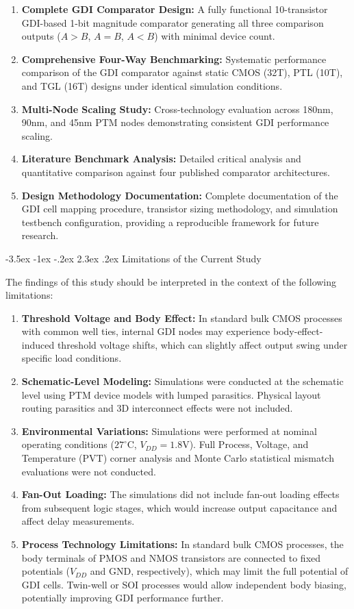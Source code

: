 \documentclass[12pt,a4paper,oneside]{report}
\makeatletter
\renewcommand\section{\@startsection {section}{1}{\z@}%
                                   {-3.5ex \@plus -1ex \@minus -.2ex}%
                                   {2.3ex \@plus.2ex}%
                                   {\normalfont\normalsize\bfseries}}
\makeatother
\begin{document}
\begin{enumerate}
\item \textbf{Complete GDI Comparator Design:} A fully functional 10-transistor GDI-based 1-bit magnitude comparator generating all three comparison outputs ($A>B$, $A=B$, $A<B$) with minimal device count.
\item \textbf{Comprehensive Four-Way Benchmarking:} Systematic performance comparison of the GDI comparator against static CMOS (32T), PTL (10T), and TGL (16T) designs under identical simulation conditions.
\item \textbf{Multi-Node Scaling Study:} Cross-technology evaluation across 180nm, 90nm, and 45nm PTM nodes demonstrating consistent GDI performance scaling.
\item \textbf{Literature Benchmark Analysis:} Detailed critical analysis and quantitative comparison against four published comparator architectures.
\item \textbf{Design Methodology Documentation:} Complete documentation of the GDI cell mapping procedure, transistor sizing methodology, and simulation testbench configuration, providing a reproducible framework for future research.
\end{enumerate}

\section{Limitations of the Current Study}

The findings of this study should be interpreted in the context of the following limitations:

\begin{enumerate}
\item \textbf{Threshold Voltage and Body Effect:} In standard bulk CMOS processes with common well ties, internal GDI nodes may experience body-effect-induced threshold voltage shifts, which can slightly affect output swing under specific load conditions.
\item \textbf{Schematic-Level Modeling:} Simulations were conducted at the schematic level using PTM device models with lumped parasitics. Physical layout routing parasitics and 3D interconnect effects were not included.
\item \textbf{Environmental Variations:} Simulations were performed at nominal operating conditions ($27^\circ\text{C}$, $V_{DD}=1.8\text{V}$). Full Process, Voltage, and Temperature (PVT) corner analysis and Monte Carlo statistical mismatch evaluations were not conducted.
\item \textbf{Fan-Out Loading:} The simulations did not include fan-out loading effects from subsequent logic stages, which would increase output capacitance and affect delay measurements.
\item \textbf{Process Technology Limitations:} In standard bulk CMOS processes, the body terminals of PMOS and NMOS transistors are connected to fixed potentials ($V_{DD}$ and GND, respectively), which may limit the full potential of GDI cells. Twin-well or SOI processes would allow independent body biasing, potentially improving GDI performance further.
\end{enumerate}
\end{document}
